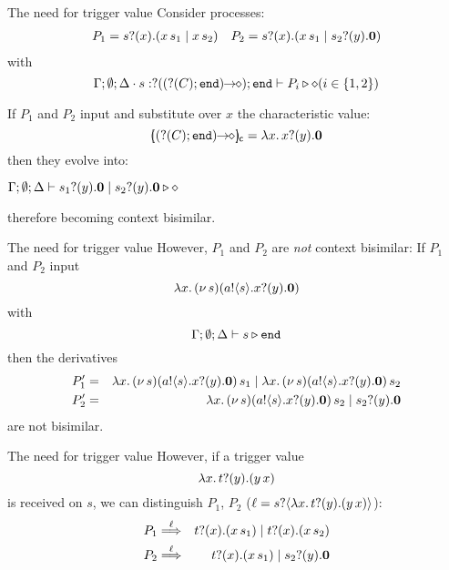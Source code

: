 \documentclass{beamer}
\begin{document}
	\begin{frame}{The need for trigger value}
		Consider   processes: %
		\begin{eqnarray*}
			P_1 = s ? (x) . (x\, {s_1} \;|\; x\, {s_2}) 
			& & 
			P_2 = s ? (x) . (x\, {s_1} \;|\; s_2 ? (y) . \mathbf{0}) 
		\end{eqnarray*}
		with
		\[
			\Gamma; \emptyset; \Delta \cdot s: ? ((? (C) ; \mathtt{end})\!\! \rightarrow\!\! \diamond) ; \mathtt{end} \vdash P_i \triangleright \diamond (i \in \{1,2\})
		\]

		If $P_1$ and $P_2$ input and substitute over $x$
		the characteristic value:
		\[
			\omapchar{\shot{(\btinp{C} \tinact)}} = \abs{x}{\binp{x}{y} \inact}
		\] 
		then they evolve into:%
		\begin{center}
			$\Gamma; \emptyset; \Delta \vdash s_1 ? (y) . \mathbf{0} \;|\; s_2 ? (y) . \mathbf{0} \triangleright \diamond$
		\end{center}
		\noi therefore becoming 
		context bisimilar.
	\end{frame}

	\begin{frame}{The need for trigger value}
		However, $P_1$ and $P_2$
		are
		{\em not} context bisimilar:
		If 
		$P_1$ and $P_2$ input 
		\[
			\lambda x.\,(\nu\, s)(a ! \langle s \rangle . x ? (y) . \mathbf{0})
		\]
		with
		\[
			\Gamma; \emptyset; \Delta \vdash s \triangleright \mathtt{end}
		\]
		then the derivatives
		\begin{eqnarray*}
			P_1' &=& \lambda x.\,(\nu\, s)(a ! \langle s \rangle . x ? (y) . \mathbf{0})\, {s_1} \;|\; \lambda x.\,(\nu\, s)(a ! \langle s \rangle . x ? (y) . \mathbf{0})\, {s_2}\\
			P_2' &=& \lambda x.\,(\nu\, s)(a ! \langle s \rangle . x ? (y) . \mathbf{0})\, {s_2} \;|\; s_2 ? (y) . \mathbf{0}
		\end{eqnarray*}
		are not bisimilar.
	\end{frame}

	\begin{frame}{The need for trigger value}
		However, if a trigger value
		\[
			\lambda {x}.\,t ? (y) . (y\, {{x}})
		\]
		is received on $s$, we can distinguish $P_1$, $P_2$ ($\ell = s ? \langle \lambda {x}.\,t ? (y) . (y\, {{x}}) \rangle$):
		\begin{eqnarray*}
			P_1 &\stackrel{\ell}{\Longrightarrow}& t ? (x) . (x\, {s_1}) \;|\; t ? (x) . (x\, {s_2})\\
			P_2 &\stackrel{\ell}{\Longrightarrow}& t ? (x) . (x\, {s_1}) \;|\; s_2 ? (y) . \mathbf{0}
		\end{eqnarray*}
	\end{frame}
\end{document}
